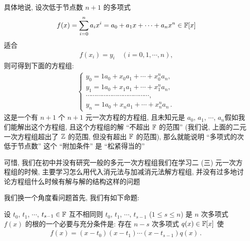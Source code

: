 具体地说, 设次低于节点数 $n+1$ 的多项式
\begin{align*}
    f(x) = \sum_{i=0}^n a_i x^i = a_0 + a_1 x + \cdots + a_n x^n \in \mathbb{F}[x]
\end{align*}
适合
\begin{align*}
    f(x_i) = y_i \quad (i = 0,1,\cdots,n),
\end{align*}
则可得到下面的方程组:
\begin{align*}
    \begin{cases}
        y_0 = 1 a_0 + x_0 a_1 + \cdots + x_0^n a_n, \\
        y_1 = 1 a_0 + x_1 a_1 + \cdots + x_1^n a_n, \\
        \cdots \cdots \cdots \cdots \cdots \cdots \cdots \cdots
        \cdots \cdots \cdots \cdots,                \\
        y_n = 1 a_0 + x_n a_1 + \cdots + x_n^n a_n \period
    \end{cases}
\end{align*}
这是一个有 $n+1$ 个 $n+1$ 元一次方程的方程组, 且未知元是 $a_0$, $a_1$, $\cdots$, $a_n$\period 假如我们能解出这个方程组, 且这个方程组的解 ``不超出 $\mathbb{F}$ 的范围'' (我们说, 上面的二元一次方程组超出了 $\mathbb{Z}$ 的范围, 但没有超出 $\mathbb{F}$ 的范围), 那么就能说明 ``多项式的次低于节点数'' 这个 ``附加条件'' 是 ``松紧得当的''\period

可惜, 我们在初中并没有研究一般的多元一次方程组\period 我们在学习二 (三) 元一次方程组的时候, 主要学习怎么用代入消元法与加减消元法解方程组, 并没有过多地讨论方程组什么时候有解与解的结构这样的问题\period

我们换一个角度看问题\period 首先, 我们有如下命题:

\begin{proposition}
    设 $t_0$, $t_1$, $\cdots$, $t_{s-1} \in \mathbb{F}$ 互不相同\period 则 $t_0$, $t_1$, $\cdots$, $t_{s-1}$ ($1 \leq s \leq n$) 是 $n$ 次多项式 $f(x)$ 的根的一个必要与充分条件是: 存在 $n-s$ 次多项式 $q(x) \in \mathbb{F}[x]$ 使
    \begin{align*}
        f(x) = (x - t_0)(x - t_1) \cdots (x-t_{s-1}) q(x) \period
    \end{align*}
\end{proposition}

